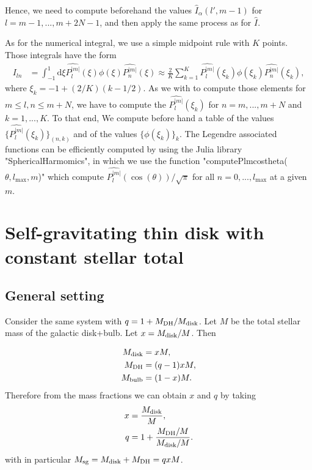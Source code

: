 \documentclass[11pt]{article}
\newcommand{\rd}{\mathrm{d}}
\newcommand{\Mb}{M_{\rm{bulb}}}
\newcommand{\Md}{M_{\rm{disk}}}
\newcommand{\Mdh}{M_{\rm{DH}}}
\newcommand{\Msg}{M_{\rm{sg}}}
\newcommand{\Pnm}{P_n^{|m|}}
\newcommand{\Plm}{P_l^{|m|}}
\newcommand{\hPnm}{\widehat{\Pnm}}
\newcommand{\hPlm}{\widehat{\Plm}}
\newcommand{\hI}{\widehat{I}}
\begin{document}
Hence, we need to compute beforehand the values $\hI_{\alpha}(l',m-1)$ for $l=m-1,...,m+2N-1$, and then apply the same process as for $\hI$. 

As for the numerical integral, we use a simple midpoint rule with $K$ points. Those integrals have the form
\begin{align*}
I_{ln} &= \int_{-1}^{1} \rd \xi \hPlm(\xi) \phi(\xi) \hPnm(\xi) \approx \frac{2}{K} \sum_{k=1}^{K} \hPlm(\xi_{k}) \phi(\xi_{k}) \hPnm(\xi_{k}),
\end{align*}
where $\xi_{k} = -1 + (2/K)(k-1/2)$. As we with to compute those elements for $m \leq l,n \leq m+N$, we have to compute the $\hPlm(\xi_{k})$ for $n=m,...,m+N$ and $k=1,...,K$. To that end, We compute before hand a table of the values $\{\hPlm(\xi_{k})\}_{(n,k)}$ and of the values $\{\phi(\xi_{k})\}_{k}$. The Legendre associated functions can be efficiently computed by using the Julia library "SphericalHarmomics", in which we use the function "computePlmcostheta($\theta,l_{\max},m$)" which compute $\hPlm(\cos(\theta))/\sqrt{\pi}$ for all $n=0,...,l_{\max}$ at a given $m$.



\section{Self-gravitating thin disk with constant stellar total}
\label{sec:sg_disk_cst_mass}

\subsection{General setting}

Consider the same system with $q=1+\Mdh/\Md$. Let $M$ be the total stellar mass of the galactic disk+bulb. Let $x=\Md/M$.  Then

\begin{align*}
\Md &= x M,\\
\Mdh &= (q-1) x M,\\
\Mb &= (1 - x)M  .
\end{align*}
Therefore from the mass fractions we can obtain $x$ and $q$ by taking
\begin{align*}
x&=  \frac{\Md }{M},\\
q &= 1+\frac{\Mdh/M}{\Md/M}  .
\end{align*}
with in particular $\Msg = \Md +\Mdh  = qx M$.
\end{document}
